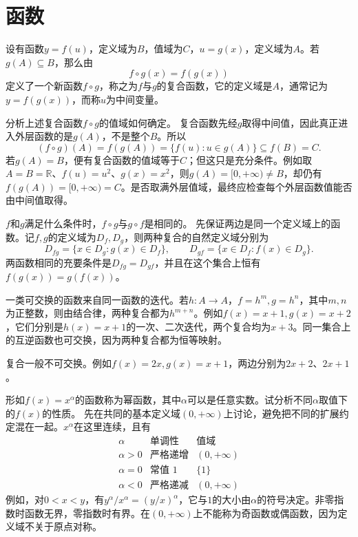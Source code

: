 \par\addvspace{12pt}

\section{函数}

\label{sol:sec:functions:1}

设有函数\(y = f(u)\)，定义域为\(B\)，值域为\(C\)，\(u = g(x)\)，定义域为\(A\)。若\(g(A)\subseteq B\)，那么由
\begin{equation*}
f \circ g(x) = f(g(x))
\end{equation*}
定义了一个新函数\(f \circ g\)，称之为\(f\)与\(g\)的复合函数，它的定义域是\(A\)，通常记为\(y = f(g(x))\)，而称\(u\)为中间变量。

分析上述复合函数\(f\circ g\)的值域如何确定。
\solutionanswer
复合函数先经\(g\)取得中间值，因此真正进入外层函数的是\(g(A)\)，不是整个\(B\)。所以
\[
(f\circ g)(A)=f(g(A))=\{f(u):u\in g(A)\}\subseteq f(B)=C.
\]
若\(g(A)=B\)，便有复合函数的值域等于\(C\)；但这只是充分条件。例如取\(A=B=\mathbb R\)、\(f(u)=u^2\)、\(g(x)=x^2\)，则\(g(A)=[0,+\infty)\ne B\)，却仍有\(f(g(A))=[0,+\infty)=C\)。是否取满外层值域，最终应检查每个外层函数值能否由中间值取得。


\(f\)和\(g\)满足什么条件时，\(f\circ g\)与\(g\circ f\)是相同的。
\solutionanswer
先保证两边是同一个定义域上的函数。记\(f,g\)的定义域为\(D_f,D_g\)，则两种复合的自然定义域分别为
\[
D_{fg}=\{x\in D_g:g(x)\in D_f\},\qquad
D_{gf}=\{x\in D_f:f(x)\in D_g\}.
\]
两函数相同的充要条件是\(D_{fg}=D_{gf}\)，并且在这个集合上恒有\(f(g(x))=g(f(x))\)。

一类可交换的函数来自同一函数的迭代。若\(h:A\to A\)，\(f=h^m,g=h^n\)，其中\(m,n\)为正整数，则由结合律，两种复合都为\(h^{m+n}\)。例如\(f(x)=x+1,g(x)=x+2\)，它们分别是\(h(x)=x+1\)的一次、二次迭代，两个复合均为\(x+3\)。同一集合上的互逆函数也可交换，因为两种复合都为恒等映射。

复合一般不可交换。例如\(f(x)=2x,g(x)=x+1\)，两边分别为\(2x+2\)、\(2x+1\)。


形如\(f(x) = x^{\alpha}\)的函数称为幂函数，其中\(\alpha\)可以是任意实数。试分析不同\(\alpha\)取值下的\(f(x)\)的性质。
\solutionanswer
先在共同的基本定义域\((0,+\infty)\)上讨论，避免把不同的扩展约定混在一起。\(x^\alpha\)在这里连续，且有
\[
\begin{array}{c|c|c}
\alpha&\text{单调性}&\text{值域}\\\hline
\alpha>0&\text{严格递增}&(0,+\infty)\\
\alpha=0&\text{常值 }1&\{1\}\\
\alpha<0&\text{严格递减}&(0,+\infty)
\end{array}
\]
例如，对\(0<x<y\)，有\(y^\alpha/x^\alpha=(y/x)^\alpha\)，它与\(1\)的大小由\(\alpha\)的符号决定。非零指数时函数无界，零指数时有界。在\((0,+\infty)\)上不能称为奇函数或偶函数，因为定义域不关于原点对称。

